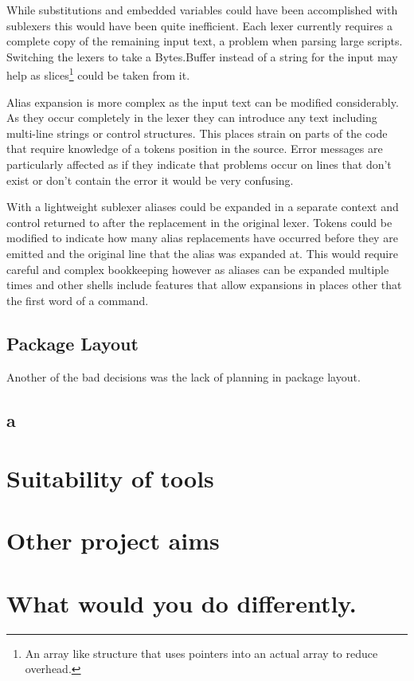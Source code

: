 While substitutions and embedded variables could have been accomplished with sublexers this would have been quite inefficient. 
Each lexer currently requires a complete copy of the remaining input text, a problem when parsing large scripts.
Switching the lexers to take a Bytes.Buffer instead of a string for the input may help as slices\footnote{An array like structure that uses pointers into an actual array to reduce overhead.} could be taken from it.

Alias expansion is more complex as the input text can be modified considerably.
As they occur completely in the lexer they can introduce any text including multi-line strings or control structures.
This places strain on parts of the code that require knowledge of a tokens position in the source.
Error messages are particularly affected as if they indicate that problems occur on lines that don't exist or don't contain the error it would be very confusing. 

With a lightweight sublexer aliases could be expanded in a separate context and control returned to after the replacement in the original lexer.
Tokens could be modified to indicate how many alias replacements have occurred before they are emitted and the original line that the alias was expanded at.
This would require careful and complex bookkeeping however as aliases can be expanded multiple times and other shells include features that allow expansions in places other that the first word of a command.

\subsection{Package Layout}
Another of the bad decisions was the lack of planning in package layout.



\subsection{a}


\section{Suitability of tools}

\section{Other project aims}

\section{What would you do differently.}













